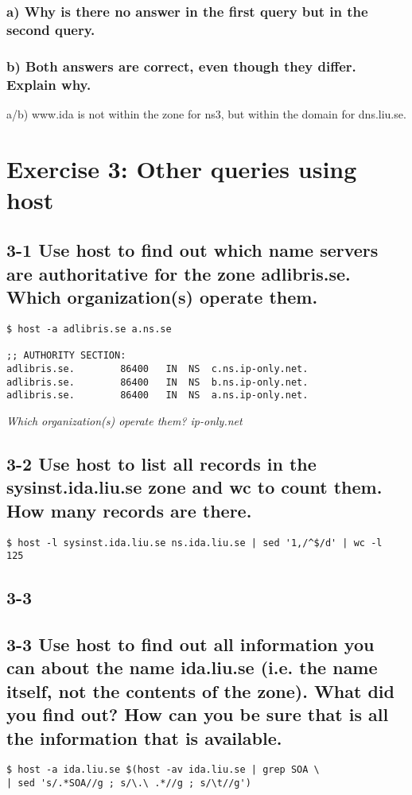 \subsubsection{a) Why is there no answer in the first query but in the second query.}
\subsubsection{b) Both answers are correct, even though they differ. Explain why.}
a/b) www.ida is not within the zone for ns3, but within the domain for dns.liu.se.

\section{Exercise 3: Other queries using host}
\subsection{3-1 Use host to find out which name servers are authoritative for the zone adlibris.se. Which organization(s) operate them.}

\begin{verbatim}
$ host -a adlibris.se a.ns.se

;; AUTHORITY SECTION:
adlibris.se.		86400	IN	NS	c.ns.ip-only.net.
adlibris.se.		86400	IN	NS	b.ns.ip-only.net.
adlibris.se.		86400	IN	NS	a.ns.ip-only.net.
\end{verbatim}

\em Which organization(s) operate them?\em
ip-only.net

\subsection{3-2 Use host to list all records in the sysinst.ida.liu.se zone and wc to count them. How many records are there.}
\verb=$ host -l sysinst.ida.liu.se ns.ida.liu.se | sed '1,/^$/d' | wc -l=\\
\verb=125=

\subsection{3-3}
\subsection{3-3 Use host to find out all information you can about the name ida.liu.se (i.e. the name itself, not the contents of the zone). What did you find out? How can you be sure that is all the information that is available.}
\verb=$ host -a ida.liu.se $(host -av ida.liu.se | grep SOA \=\\
\verb=| sed 's/.*SOA//g ; s/\.\ .*//g ; s/\t//g')=

